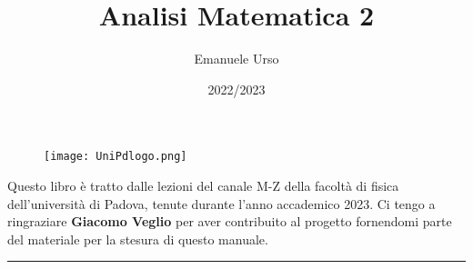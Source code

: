 \documentclass[a4paper]{article}
\begin{document}
	

	
	\title{\Huge Analisi Matematica 2}
	\author{{\Large Emanuele Urso} \\
	{\small{\href{mailto:emanuele.urso@studenti.unipd.it}{\color{black}{emanuele.urso@studenti.unipd.it} }}}}
	\date{2022/2023}
	\maketitle
	
	\begin{figure}[!h]
		\centering
		\texttt{[image: UniPdlogo.png]}
	\end{figure}
	
	\vfill
	
	Questo libro è tratto dalle lezioni del canale M-Z della facoltà di fisica dell'università di Padova, tenute durante l'anno accademico 2023. Ci tengo a ringraziare \textbf{Giacomo Veglio} per aver contribuito al progetto fornendomi parte del materiale per la stesura di questo manuale.
	
	\vspace{10em}
	
	
	\begin{center}
		\rule{.9\textwidth}{0.4pt}%
	\end{center}
	
	\hypersetup{linkcolor=black}
	\tableofcontents   
	
\newpage



\newpage


\end{document}
